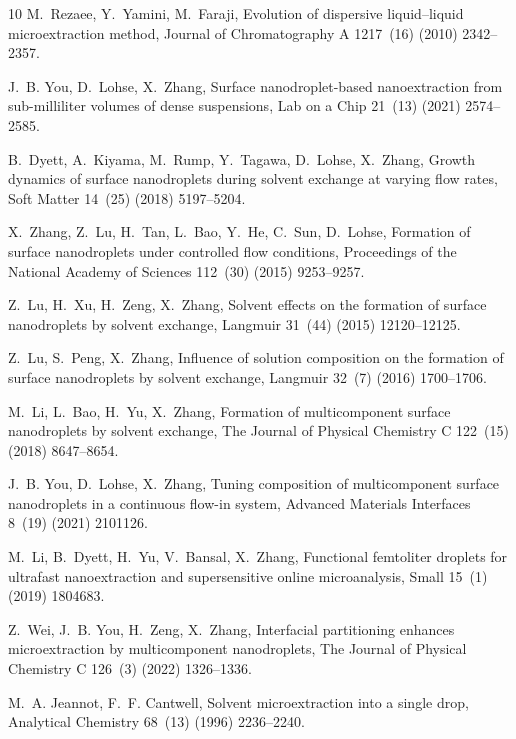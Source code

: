 \documentclass[a4paper,fleqn]{cas-dc}
\begin{document}
\begin{sloppypar}
\begin{thebibliography}{10}
M.~Rezaee, Y.~Yamini, M.~Faraji, Evolution of dispersive liquid--liquid
  microextraction method, Journal of Chromatography A 1217~(16) (2010)
  2342--2357.

J.~B. You, D.~Lohse, X.~Zhang, Surface nanodroplet-based nanoextraction from
  sub-milliliter volumes of dense suspensions, Lab on a Chip 21~(13) (2021)
  2574--2585.

B.~Dyett, A.~Kiyama, M.~Rump, Y.~Tagawa, D.~Lohse, X.~Zhang, Growth dynamics of
  surface nanodroplets during solvent exchange at varying flow rates, Soft
  Matter 14~(25) (2018) 5197--5204.

X.~Zhang, Z.~Lu, H.~Tan, L.~Bao, Y.~He, C.~Sun, D.~Lohse, Formation of surface
  nanodroplets under controlled flow conditions, Proceedings of the National
  Academy of Sciences 112~(30) (2015) 9253--9257.

Z.~Lu, H.~Xu, H.~Zeng, X.~Zhang, Solvent effects on the formation of surface
  nanodroplets by solvent exchange, Langmuir 31~(44) (2015) 12120--12125.

Z.~Lu, S.~Peng, X.~Zhang, Influence of solution composition on the formation of
  surface nanodroplets by solvent exchange, Langmuir 32~(7) (2016) 1700--1706.

M.~Li, L.~Bao, H.~Yu, X.~Zhang, Formation of multicomponent surface
  nanodroplets by solvent exchange, The Journal of Physical Chemistry C
  122~(15) (2018) 8647--8654.

J.~B. You, D.~Lohse, X.~Zhang, Tuning composition of multicomponent surface
  nanodroplets in a continuous flow-in system, Advanced Materials Interfaces
  8~(19) (2021) 2101126.

M.~Li, B.~Dyett, H.~Yu, V.~Bansal, X.~Zhang, Functional femtoliter droplets for
  ultrafast nanoextraction and supersensitive online microanalysis, Small
  15~(1) (2019) 1804683.

Z.~Wei, J.~B. You, H.~Zeng, X.~Zhang, Interfacial partitioning enhances
  microextraction by multicomponent nanodroplets, The Journal of Physical
  Chemistry C 126~(3) (2022) 1326--1336.

M.~A. Jeannot, F.~F. Cantwell, Solvent microextraction into a single drop,
  Analytical Chemistry 68~(13) (1996) 2236--2240.


\end{thebibliography}
\end{sloppypar}
\end{document}
